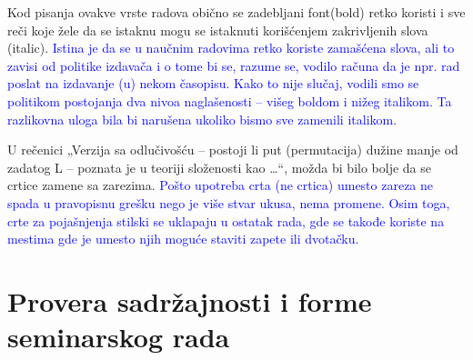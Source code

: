\documentclass[a4paper]{report}
\newcommand{\odgovor}[1]{\textcolor{blue}{#1}}
\begin{document}
Kod pisanja ovakve vrste radova obično se zadebljani font(bold)  retko koristi i sve reči koje žele da se istaknu mogu se istaknuti korišćenjem zakrivljenih slova (italic). \odgovor{Istina je da se u naučnim radovima retko koriste zamašćena slova, ali to zavisi od politike izdavača i o tome bi se, razume se, vodilo računa da je npr. rad poslat na izdavanje (u) nekom časopisu. Kako to nije slučaj, vodili smo se politikom postojanja dva nivoa naglašenosti -- višeg boldom i nižeg italikom. Ta razlikovna uloga bila bi narušena ukoliko bismo sve zamenili italikom.}

U rečenici „Verzija sa odlučivošću – postoji li put (permutacija) dužine manje od zadatog L – poznata je u teoriji složenosti kao …“, možda bi bilo bolje da se crtice zamene sa zarezima. \odgovor{Pošto upotreba crta (ne crtica) umesto zareza ne spada u pravopisnu grešku nego je više stvar ukusa, nema promene. Osim toga, crte za pojašnjenja stilski se uklapaju u ostatak rada, gde se takođe koriste na mestima gde je umesto njih moguće staviti zapete ili dvotačku.}


\section{Provera sadržajnosti i forme seminarskog rada}
\end{document}
